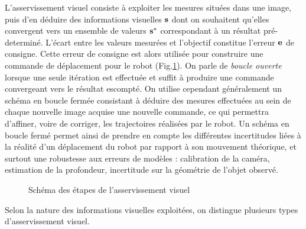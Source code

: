 L'asservissement visuel consiste \`a exploiter les mesures situ\'ees dans une 
image, puis d'en d\'eduire des informations visuelles ${\bf s}$ dont on 
souhaitent qu'elles convergent vers un ensemble de valeurs ${\bf s}^*$ 
correspondant \`a un r\'esultat pr\'e-determin\'e. L'\'ecart entre les valeurs 
mesur\'ees et l'objectif constitue l'erreur ${\bf e}$ de consigne. Cette erreur 
de consigne est alors utilis\'ee pour construire une commande de d\'eplacement 
pour le robot (Fig.\ref{chap01:fig05}). On parle de {\it boucle ouverte} lorsque 
une seule it\'eration est effectu\'ee et suffit \`a produire une commande 
convergeant vers le r\'esultat escompt\'e. On utilise cependant 
g\'en\'eralement un sch\'ema en boucle ferm\'ee consistant \`a déduire 
des mesures effectu\'ees au sein de chaque nouvelle image acquise une 
nouvelle commande, ce qui permettra d'affiner, voire de corriger, les 
trajectoires r\'ealis\'ees par le robot. Un sch\'ema en boucle ferm\'e permet 
ainsi de prendre en compte les diff\'erentes incertitudes li\'ees \`a la 
r\'ealit\'e d'un d\'eplacement du robot par rapport \`a son mouvement 
th\'eorique, et surtout une robustesse aux erreurs de 
mod\`eles : calibration de la cam\'era, estimation de la profondeur, 
incertitude sur la g\'eom\'etrie de l'objet observ\'e.

\begin{figure}[htp]
  \centering
    \def\svgwidth{.95\linewidth}
  
    \caption{\footnotesize{Schéma des étapes de l'asservissement visuel}}
\label{chap01:fig05}
\end{figure}

Selon la nature des informations visuelles exploit\'ees, on distingue plusieurs 
types d'asservissement visuel.\\

\\

